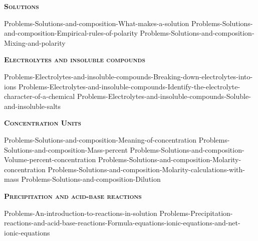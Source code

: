 \documentclass[main.tex]{subfiles}
\newcommand\chapterlabel{Ch-electrolytes}
\begin{document}
\newpage
\setdoublesep{0.35700 em}  %
\setatomsep{1.78500 em}    %
\setbondoffset{0.18265 em} %
\newcommand{\bondwidth}{0.06642 em} %
\setbondstyle{line width = \bondwidth}
\fancyhfoffset[E,O]{0pt}
\setlength{\columnsep}{30pt}
\begin{conclusion}
\end{conclusion}
\begin{multicols*}{2}\setcounter{numA}{1}


{\raggedright\textsc{\textbf{Solutions }}\par}
{Problems-Solutions-and-composition-What-makes-a-solution}
{Problems-Solutions-and-composition-Empirical-rules-of-polarity}
{Problems-Solutions-and-composition-Mixing-and-polarity}


{\raggedright\textsc{\textbf{Electrolytes and insoluble compounds}}\par}
{Problems-Electrolytes-and-insoluble-compounds-Breaking-down-electrolytes-into-ions}%
{Problems-Electrolytes-and-insoluble-compounds-Identify-the-electrolyte-character-of-a-chemical}
{Problems-Electrolytes-and-insoluble-compounds-Soluble-and-insoluble-salts}


{\raggedright\textsc{\textbf{Concentration Units }}\par}
{Problems-Solutions-and-composition-Meaning-of-concentration}
{Problems-Solutions-and-composition-Mass-percent}
{Problems-Solutions-and-composition-Volume-percent-concentration}
{Problems-Solutions-and-composition-Molarity-concentration}
{Problems-Solutions-and-composition-Molarity-calculations-with-mass}
{Problems-Solutions-and-composition-Dilution}



{\raggedright\textsc{\textbf{Precipitation and acid-base reactions}}\par}
{Problems-An-introduction-to-reactions-in-solution}
{Problems-Precipitation-reactions-and-acid-base-reactions-Formula-equations-ionic-equations-and-net-ionic-equations}%


\end{multicols*}
\end{document}
